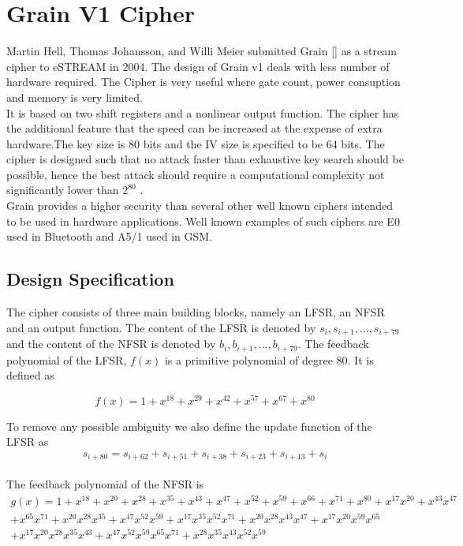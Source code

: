 \section{Grain V1 Cipher}
Martin Hell, Thomas Johansson, and Willi Meier  submitted Grain [\cite{hell2007grain}] as a stream cipher to eSTREAM in 2004. The design of Grain v1 deals with less number of hardware required. The Cipher is very useful where gate count, power consuption and memory is very limited.\\[2mm]
It is based on two shift registers and a nonlinear output function. The cipher has the additional feature that the speed can be increased at the expense of extra hardware.The key size is 80 bits and the IV size is specified to be 64 bits. The cipher is designed such that no attack faster than exhaustive key search should be possible, hence the best attack should require a computational complexity not significantly lower than $2^{80}$ .\\[2mm]
Grain provides a higher security than several other well known ciphers intended to be used in hardware applications. Well known examples of such ciphers are E0 used in Bluetooth and A5/1 used in GSM.


\subsection{ Design Specification}
The cipher consists of three main building blocks, namely an
LFSR, an NFSR and an output function. The content of the LFSR is denoted by $s_i , s_{i+1} , . . . , s_{i+79} $ and the content of the NFSR is denoted by $b_i , b_{i+1} , . . . , b_{i+79} $.
The feedback polynomial of the LFSR, $f (x)$ is a primitive polynomial of degree 80. It is defined as

\begin{equation}
f(x)=1+x^{18}+x^{29}+x^{42}+x^{57}+x^{67}+x^{80}
\end{equation}

To remove any possible ambiguity we also define the update function of the LFSR as
\begin{equation}
s_{i+80}=s_{i+62}+s_{i+51}+s_{i+38}+s_{i+23}+s_{i+13}+s_{i}
\end{equation}
\\
The feedback polynomial of the NFSR is 
\begin{multline}
	g(x) = 1 + x^{18} + x^{20} + x^{28} + x^{35} + x^{43} + x^{47} + x^{52} + x^{59} + x^{66} + x^{71} + x^{80} + x^{17}x^{20} + x^{43}x^{47} \\ + x^{65}x^{71} + x^{20}x^{28}x^{35} + x^{47}x^{52}x^{59} + x^{17}x^{35}x^{52}x^{71} + x^{20}x^{28}x^{43}x^{47} + x^{17}x^{20}x^{59}x^{65} \\+ x^{17}x^{20}x^{28}x^{35}x^{43} + x^{47}x^{52}x^{59}x^{65}x^{71} + x^{28}x^{35}x^{43}x^{52}x^{59}
\end{multline}

